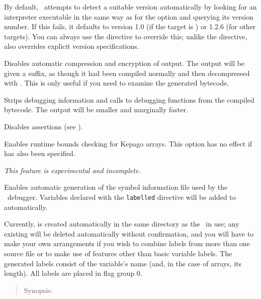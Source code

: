 \begin{nicelist}
    By default, \compiler\ attempts to detect a suitable version automatically 
    by looking for an interpreter executable in the same way as for the 
     option and querying its version number.  If this fails, it 
    defaults to version 1.0 (if the target is \avgns) or 1.2.6 (for other 
    targets). You can always use the  directive to override 
    this; unlike the  directive,  also overrides 
    explicit version specifications.    
  \item[\clboth{u}{uncompressed}]
    Disables automatic compression and encryption of output.  The output will be
    given a  suffix, as though it had been compiled normally
    and then decompressed with .  This is only useful if you need
    to examine the generated bytecode.
  \item[\clboth{g}{no-debug}]
    Strips debugging information and calls to debugging functions from the 
    compiled bytecode.  The output will be smaller and marginally faster.
  \item[\cllong{no-assert}]
    Disables assertions (see ).
  \item[\cllong{safe-arrays}]
    Enables runtime bounds checking for Kepago arrays.  This option has no effect 
    if  has also been specified.
  \item[\cllong{flag-labels}]
    \emph{This feature is experimental and incomplete.}

    Enables automatic generation of the  symbol information file 
    used by the \reallive\ debugger.  Variables declared with the 
    \texttt{labelled} directive will be added to  automatically.  
    
    Currently,  is created automatically in the same directory as 
    the \gameexe\ in use; any existing  will be deleted 
    automatically without confirmation, and you will have to make your own 
    arrangements if you wish to combine labels from more than one source file or 
    to make use of  features other than basic variable labels. 
    The generated labels consist of the variable's name (and, in the case of 
    arrays, its length).  All labels are placed in flag group 0.    
  \end{nicelist}

\clearpage
{}

  \begin{quote}
    Synopsis:   
  \end{quote}

